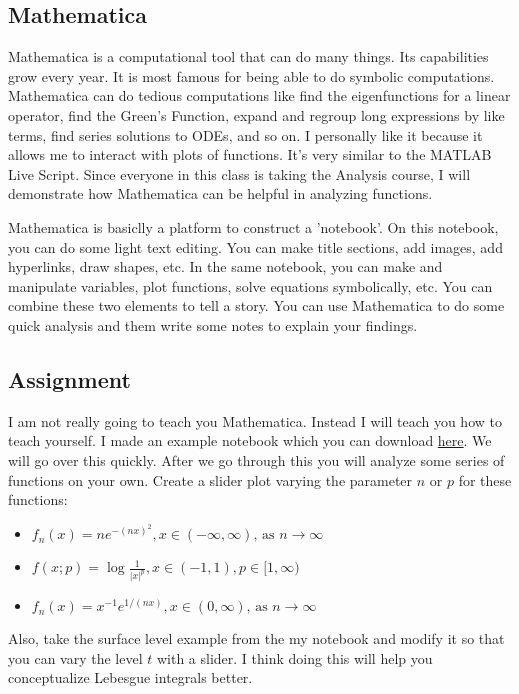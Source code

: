 \documentclass{article}
\begin{document}
\subsection{Mathematica}
Mathematica is a computational tool that can do many things. Its capabilities grow every year. It is most famous for being able to do symbolic computations. Mathematica can do tedious computations like find the eigenfunctions for a linear operator, find the Green's Function, expand and regroup long expressions by like terms, find series solutions to ODEs, and so on. I personally like it because it allows me to interact with plots of functions. It's very similar to the MATLAB Live Script. Since everyone in this class is taking the Analysis course, I will demonstrate how Mathematica can be helpful in analyzing functions.

Mathematica is basiclly a platform to construct a 'notebook'. On this notebook, you can do some light text editing. You can make title sections, add images, add hyperlinks, draw shapes, etc. In the same notebook, you can make and manipulate variables, plot functions, solve equations symbolically, etc. You can combine these two elements to tell a story. You can use Mathematica to do some quick analysis and them write some notes to explain your findings.

\subsection{Assignment}
I am not really going to teach you Mathematica. Instead I will teach you how to teach yourself. I made an example notebook which you can download \href{https://web.njit.edu/~tt73/Files/599/example_notebook.nb}{here}. We will go over this quickly. After we go through this you will analyze some series of functions on your own. Create a slider plot varying the parameter $n$ or $p$ for these functions:
\begin{itemize}
    \item $f_n(x)=n e^{-(nx)^2}, x\in (-\infty,\infty) \text{, as }  n \rightarrow \infty$
    \item $f(x;p)=\log\frac{1}{|x|^p}, x\in (-1,1), p \in [1,\infty)$
    \item $f_n(x)=x^{-1}e^{1/(nx)}, x\in (0,\infty) \text{, as }  n \rightarrow \infty$
\end{itemize}

Also, take the surface level example from the my notebook and modify it so that you can vary the level $t$ with a slider. I think doing this will help you conceptualize Lebesgue integrals better.
\end{document}
